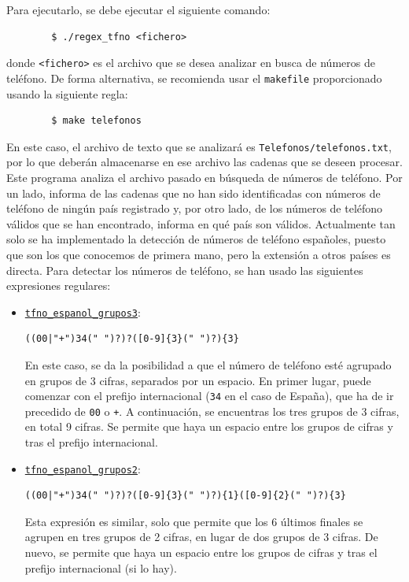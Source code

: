 \documentclass[12pt]{article}
\begin{document}
    Para ejecutarlo, se debe ejecutar el siguiente comando:
    \begin{verbatim}
        $ ./regex_tfno <fichero>
    \end{verbatim}
    donde \verb|<fichero>| es el archivo que se desea analizar en busca de números de teléfono.
    De forma alternativa, se recomienda usar el \verb|makefile| proporcionado usando la siguiente regla:
    \begin{verbatim}
        $ make telefonos
    \end{verbatim}
    En este caso, el archivo de texto que se analizará es \verb|Telefonos/telefonos.txt|, por lo que deberán almacenarse en ese archivo las cadenas que se deseen procesar.\\

    Este programa analiza el archivo pasado en búsqueda de números de teléfono. Por un lado, informa de las cadenas que no han sido identificadas con números de teléfono de ningún país registrado y, por otro lado, de los números de teléfono válidos que se han encontrado, informa en qué país son válidos. Actualmente tan solo se ha implementado la detección de números de teléfono españoles, puesto que son los que conocemos de primera mano, pero la extensión a otros países es directa.
    Para detectar los números de teléfono, se han usado las siguientes expresiones regulares:
    \begin{itemize}
        \item \ul{\texttt{tfno\_espanol\_grupos3}}:
        \begin{lstlisting}
((00|"+")34(" ")?)?([0-9]{3}(" ")?){3}
        \end{lstlisting}
        
        En este caso, se da la posibilidad a que el número de teléfono esté agrupado en grupos de 3 cifras, separados por un espacio. En primer lugar, puede comenzar con el prefijo internacional (\verb|34| en el caso de España), que ha de ir precedido de \verb|00| o \verb|+|. A continuación, se encuentras los tres grupos de 3 cifras, en total 9 cifras. Se permite que haya un espacio entre los grupos de cifras y tras el prefijo internacional.

        \item \ul{\texttt{tfno\_espanol\_grupos2}}:
        \begin{lstlisting}
((00|"+")34(" ")?)?([0-9]{3}(" ")?){1}([0-9]{2}(" ")?){3}
        \end{lstlisting}
        
        Esta expresión es similar, solo que permite que los 6 últimos finales se agrupen en tres grupos de 2 cifras, en lugar de dos grupos de 3 cifras. De nuevo, se permite que haya un espacio entre los grupos de cifras y tras el prefijo internacional (si lo hay).
    \end{itemize}
\end{document}

